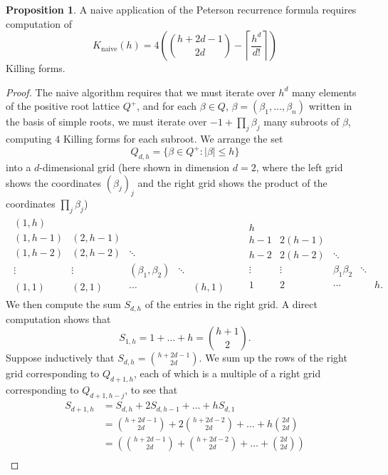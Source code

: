 \documentclass[12pt]{article}
\newcommand{\Knaive}{K_{\text{naive}}}
\theoremstyle{definition}
\newtheorem{prop}[theorem]{Proposition}
\begin{document}
\begin{prop}
    A naive application of the Peterson recurrence formula requires computation of
    $$\Knaive(h) = 4\left(\binom{h+2d-1}{2d} - \left\lceil \frac{h^d}{d!}\right\rceil\right)$$
    Killing forms.
\end{prop}
\begin{proof}
    The naive algorithm requires that we must iterate over $h^d$ many elements of the positive root lattice $Q^+$, and for each $\beta \in Q$, $\beta = (\beta_1, \dots, \beta_n)$ written in the basis of simple roots, we must iterate over $-1 + \prod_j \beta_j$ many subroots of $\beta$, computing $4$ Killing forms for each subroot. We arrange the set
    $$Q_{d,h} = \{\beta \in Q^+: |\beta| \leq h\}$$
    into a $d$-dimensional grid (here shown in dimension $d = 2$, where the left grid shows the coordinates $(\beta_j)_j$ and the right grid shows the product of the coordinates $\prod_j \beta_j$)
\begin{align*}
\begin{matrix}
    (1, h) &\\
    (1, h - 1) & (2, h - 1)\\
    (1, h - 2) & (2, h - 2) & \ddots \\
    \vdots &\vdots &(\beta_1, \beta_2) &\ddots \\
    (1, 1) &(2, 1) & \cdots && (h, 1)
\end{matrix}
&&
\begin{matrix}
    h &\\
    h - 1 & 2(h - 1)\\
    h - 2 & 2(h-2) & \ddots \\
    \vdots &\vdots &\beta_1\beta_2&\ddots \\
    1 &2 & \cdots && h.
\end{matrix}
\end{align*}
    We then compute the sum $S_{d,h}$ of the entries in the right grid. A direct computation shows that
    $$S_{1,h} = 1 + \dots + h = \binom{h+1}{2}.$$
    Suppose inductively that $S_{d,h} = \binom{h+2d-1}{2d}$. We sum up the rows of the right grid corresponding to $Q_{d+1,h}$, each of which is a multiple of a right grid corresponding to $Q_{d+1,h-j}$, to see that
\begin{align*}
    S_{d+1,h} &= S_{d,h} + 2S_{d,h-1} + \dots + hS_{d,1}\\
    &= \binom{h+2d-1}{2d} + 2\binom{h+2d-2}{2d} + \dots + h\binom{2d}{2d}\\
    &= \left(\binom{h+2d-1}{2d} + \binom{h+2d-2}{2d} + \dots + \binom{2d}{2d}\right)\\

\end{align*}
\end{proof}
\end{document}
